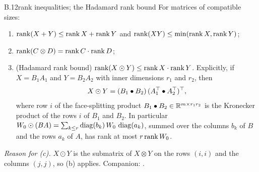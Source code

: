 \begin{auxresult}{B.12}{rank inequalities; the Hadamard rank bound}{\citep[Ch.~4 and 5]{xhorn1991topics}}
For matrices of compatible sizes:
\begin{enumerate}[label=(\alph*)]
  \item $\operatorname{rank}(X+Y)\le\operatorname{rank} X+\operatorname{rank} Y$ and $\operatorname{rank}(XY)\le\min(\operatorname{rank} X,\operatorname{rank} Y)$;
  \item $\operatorname{rank}(C\otimes D)=\operatorname{rank} C\cdot\operatorname{rank} D$;
  \item (Hadamard rank bound) $\operatorname{rank}(X\odot Y)\le\operatorname{rank} X\cdot\operatorname{rank} Y$. Explicitly, if $X=B_1A_1$ and $Y=B_2A_2$ with inner
    dimensions $r_1$ and $r_2$, then
    \begin{equation*}
      X\odot Y=(B_1\bullet B_2)\,(A_1^{\top}\bullet A_2^{\top})^{\top} ,
    \end{equation*}
    where row $i$ of the face-splitting product $B_1\bullet B_2\in\mathbb{R}^{m\times r_1r_2}$ is the Kronecker product of the
    rows $i$ of $B_1$ and $B_2$. In particular $W_0\odot(BA)=\sum_{k\le r}\operatorname{diag}(b_k)\,W_0\,\operatorname{diag}(a_k)$, summed over the
    columns $b_k$ of $B$ and the rows $a_k$ of $A$, has rank at most $r\operatorname{rank} W_0$.
\end{enumerate}
\end{auxresult}
\noindent\emph{Reason for (c).} $X\odot Y$ is the submatrix of $X\otimes Y$ on the rows $(i,i)$ and the columns
$(j,j)$, so (b) applies. Companion: .

